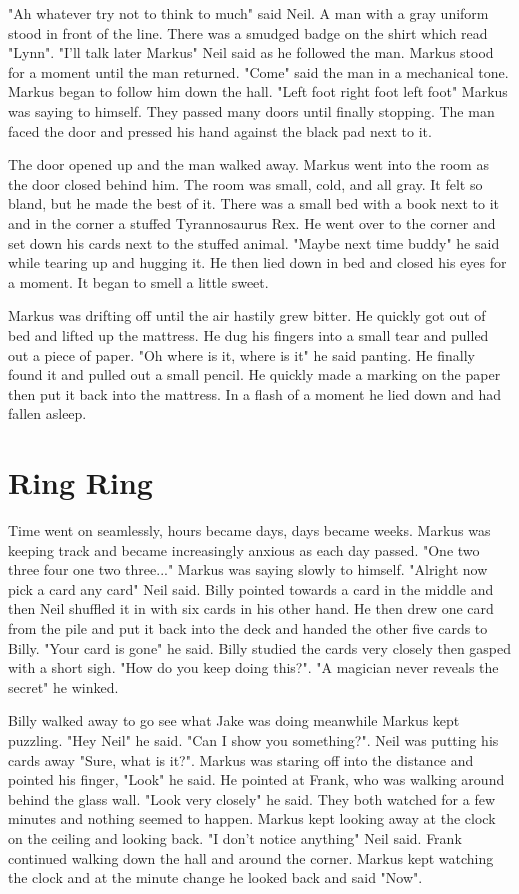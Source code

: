 \documentclass[12pt]{book}
\begin{document}
"Ah whatever try not to think to much" said Neil. A man with a gray uniform stood in front of the line. There was a smudged badge on the shirt which read "Lynn". "I'll talk later Markus" Neil said as he followed the man. Markus stood for a moment until the man returned. "Come" said the man in a mechanical tone. Markus began to follow him down the hall. "Left foot right foot left foot" Markus was saying to himself. They passed many doors until finally stopping. The man faced the door and pressed his hand against the black pad next to it.

The door opened up and the man walked away. Markus went into the room as the door closed behind him. The room was small, cold, and all gray. It felt so bland, but he made the best of it. There was a small bed with a book next to it and in the corner a stuffed Tyrannosaurus Rex. He went over to the corner and set down his cards next to the stuffed animal. "Maybe next time buddy" he said while tearing up and hugging it. He then lied down in bed and closed his eyes for a moment. It began to smell a little sweet.

Markus was drifting off until the air hastily grew bitter. He quickly got out of bed and lifted up the mattress. He dug his fingers into a small tear and pulled out a piece of paper. "Oh where is it, where is it" he said panting. He finally found it and pulled out a small pencil. He quickly made a marking on the paper then put it back into the mattress. In a flash of a moment he lied down and had fallen asleep.

\chapter{Ring Ring}

Time went on seamlessly, hours became days, days became weeks. Markus was keeping track and became increasingly anxious as each day passed. "One two three four one two three..." Markus was saying slowly to himself. "Alright now pick a card any card" Neil said. Billy pointed towards a card in the middle and then Neil shuffled it in with six cards in his other hand. He then drew one card from the pile and put it back into the deck and handed the other five cards to Billy. "Your card is gone" he said. Billy studied the cards very closely then gasped with a short sigh. "How do you keep doing this?". "A magician never reveals the secret" he winked.

Billy walked away to go see what Jake was doing meanwhile Markus kept puzzling. "Hey Neil" he said. "Can I show you something?". Neil was putting his cards away "Sure, what is it?". Markus was staring off into the distance and pointed his finger, "Look" he said. He pointed at Frank, who was walking around behind the glass wall. "Look very closely" he said. They both watched for a few minutes and nothing seemed to happen. Markus kept looking away at the clock on the ceiling and looking back. "I don't notice anything" Neil said. Frank continued walking down the hall and around the corner. Markus kept watching the clock and at the minute change he looked back and said "Now".
\end{document}
